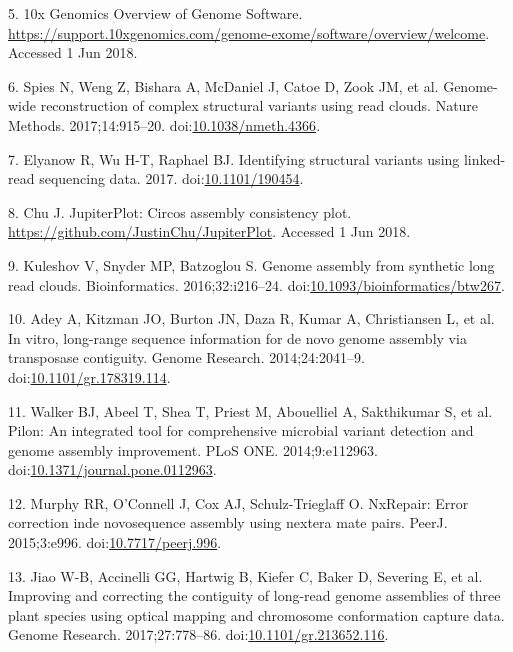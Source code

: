\documentclass{bmcart}
\begin{document}
\begin{backmatter}
\leavevmode\hypertarget{ref-URL_10x}{}%
5. 10x Genomics Overview of Genome Software. \url{https://support.10xgenomics.com/genome-exome/software/overview/welcome}. Accessed 1 Jun 2018.

\leavevmode\hypertarget{ref-Spies_2017}{}%
6. Spies N, Weng Z, Bishara A, McDaniel J, Catoe D, Zook JM, et al. Genome-wide reconstruction of complex structural variants using read clouds. Nature Methods. 2017;14:915--20. doi:\href{https://doi.org/10.1038/nmeth.4366}{10.1038/nmeth.4366}.

\leavevmode\hypertarget{ref-Elyanow_2017}{}%
7. Elyanow R, Wu H-T, Raphael BJ. Identifying structural variants using linked-read sequencing data. 2017. doi:\href{https://doi.org/10.1101/190454}{10.1101/190454}.

\leavevmode\hypertarget{ref-URL_Topsorter}{}%
8. Chu J. JupiterPlot: Circos assembly consistency plot. \url{https://github.com/JustinChu/JupiterPlot}. Accessed 1 Jun 2018.

\leavevmode\hypertarget{ref-Kuleshov_2016}{}%
9. Kuleshov V, Snyder MP, Batzoglou S. Genome assembly from synthetic long read clouds. Bioinformatics. 2016;32:i216--24. doi:\href{https://doi.org/10.1093/bioinformatics/btw267}{10.1093/bioinformatics/btw267}.

\leavevmode\hypertarget{ref-Adey_2014}{}%
10. Adey A, Kitzman JO, Burton JN, Daza R, Kumar A, Christiansen L, et al. In vitro, long-range sequence information for de novo genome assembly via transposase contiguity. Genome Research. 2014;24:2041--9. doi:\href{https://doi.org/10.1101/gr.178319.114}{10.1101/gr.178319.114}.

\leavevmode\hypertarget{ref-Walker_2014}{}%
11. Walker BJ, Abeel T, Shea T, Priest M, Abouelliel A, Sakthikumar S, et al. Pilon: An integrated tool for comprehensive microbial variant detection and genome assembly improvement. PLoS ONE. 2014;9:e112963. doi:\href{https://doi.org/10.1371/journal.pone.0112963}{10.1371/journal.pone.0112963}.

\leavevmode\hypertarget{ref-Murphy_2015}{}%
12. Murphy RR, O'Connell J, Cox AJ, Schulz-Trieglaff O. NxRepair: Error correction inde novosequence assembly using nextera mate pairs. PeerJ. 2015;3:e996. doi:\href{https://doi.org/10.7717/peerj.996}{10.7717/peerj.996}.

\leavevmode\hypertarget{ref-Jiao_2017}{}%
13. Jiao W-B, Accinelli GG, Hartwig B, Kiefer C, Baker D, Severing E, et al. Improving and correcting the contiguity of long-read genome assemblies of three plant species using optical mapping and chromosome conformation capture data. Genome Research. 2017;27:778--86. doi:\href{https://doi.org/10.1101/gr.213652.116}{10.1101/gr.213652.116}.


\end{backmatter}
\end{document}
